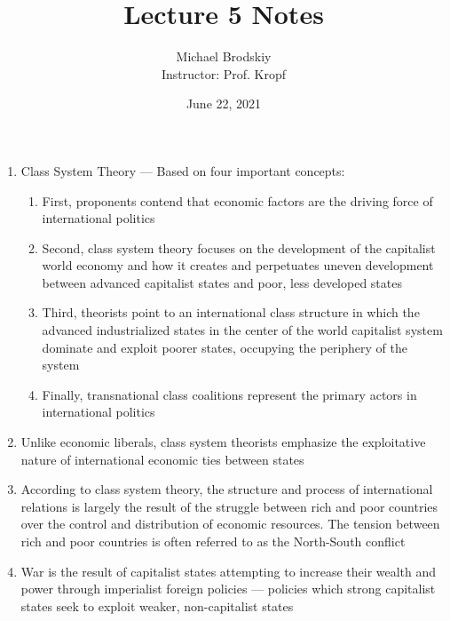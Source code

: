 \documentclass[12pt]{article}
\title{Lecture 5 Notes}
\date{June 22, 2021}
\author{Michael Brodskiy\\ \small Instructor: Prof. Kropf}
\begin{document}
    \maketitle

    \begin{enumerate}

      \item Class System Theory — Based on four important concepts:

        \begin{enumerate}

          \item First, proponents contend that economic factors are the driving force of international politics

          \item Second, class system theory focuses on the development of the capitalist world economy and how it creates and perpetuates uneven development between advanced capitalist states and poor, less developed states

          \item Third, theorists point to an international class structure in which the advanced industrialized states in the center of the world capitalist system dominate and exploit poorer states, occupying the periphery of the system

          \item Finally, transnational class coalitions represent the primary actors in international politics

        \end{enumerate}

      \item Unlike economic liberals, class system theorists emphasize the exploitative nature of international economic ties between states

      \item According to class system theory, the structure and process of international relations is largely the result of the struggle between rich and poor countries over the control and distribution of economic resources. The tension between rich and poor countries is often referred to as the North-South conflict

      \item War is the result of capitalist states attempting to increase their wealth and power through imperialist foreign policies — policies which strong capitalist states seek to exploit weaker, non-capitalist states


\end{enumerate}
\end{document}
